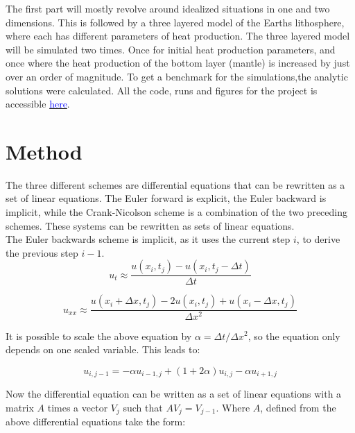 \documentclass[10pt,a4paper]{article}
\begin{document}
\noindent The first part will mostly revolve around idealized situations in one and two dimensions. This is followed by a three layered model of the Earths lithosphere, where each has different parameters of heat production. The three layered model will be simulated two times. Once for initial heat production parameters, and once where the heat production of the bottom layer (mantle) is increased by just over an order of magnitude. To get a benchmark for the simulations,the analytic solutions were calculated. All the code, runs and figures for the project is accessible \href{https://github.com/VemundStenbekkThorkildsen/Assignment5}{\textcolor{blue}{here}}.  



\section*{Method}

\noindent The three different schemes are differential equations that can be rewritten as a set of linear equations. The Euler forward is explicit, the Euler backward is implicit, while the Crank-Nicolson scheme is a combination of the two preceding schemes. These systems can be rewritten as sets of linear equations. \\


\noindent The Euler backwards scheme is implicit, as it uses the current step $i$, to derive the previous step $i-1$. 
\\
\begin{equation}
u_t \approx \frac{u(x_i,t_j) - u(x_i,t_j - \Delta t)}{\Delta t}
\end{equation}

\begin{equation}
u_{xx} \approx \frac{u(x_i + \Delta x,t_j) - 2u(x_i,t_j) + u(x_i - \Delta x,t_j)}{\Delta x^2}
\end{equation}

\noindent It is possible to scale the above equation by $\alpha = \Delta t / \Delta x^2$, so the equation only depends on one scaled variable. This leads to:

\begin{equation}
u_{i,j-1} = -\alpha u_{i-1,j} + (1 + 2\alpha)u_{i,j} - \alpha u_{i+1,j}
\end{equation}

\noindent Now the differential equation can be written as a set of linear equations with a matrix $A$ times a vector $V_j$ such that $AV_j = V_{j-1}$. Where $A$, defined from the above differential equations take the form:
\end{document}
